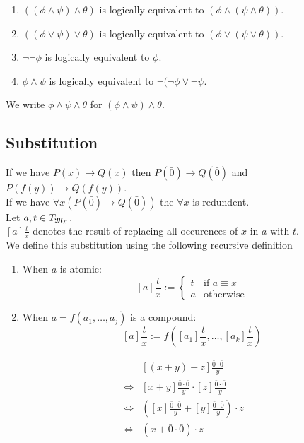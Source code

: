 \documentclass[11pt,a4paper]{article}
\begin{document}
\begin{enumerate}
	\item $((\phi\wedge\psi)\wedge\theta)$ is logically equivalent to $(\phi\wedge(\psi\wedge\theta))$.
	\item $((\phi\vee\psi)\vee\theta)$ is logically equivalent to $(\phi\vee(\psi\vee\theta))$.
	\item $\neg\neg\phi$ is logically equivalent to $\phi$.
	\item $\phi\wedge\psi$ is logically equivalent to $\neg(\neg\phi\vee\neg\psi$.
\end{enumerate}
\nb We write $\phi\wedge\psi\wedge\theta$ for $(\phi\wedge\psi)\wedge\theta$.

\subsection{Substitution}

\remark{}
If we have $P(x)\to Q(x)$ then $P(\bar0)\to Q(\bar0)$ and $P(f(y))\to Q(f(y))$.\\
If we have $\forall x(P(\bar0)\to Q(\bar0))$ the $\forall x$ is redundent.\\

Let $a,t\in T_{\mathfrak{M}_{\mathcal{L}}}$.\\
$[a]\frac{t}x$ denotes the result of replacing all occurences of $x$ in $a$ with $t$.\\
We define this substitution using the following recursive definition
\begin{enumerate}
	\item When $a$ is atomic:
	$$[a]\frac{t}x:=\begin{cases}t&\text{if }a\equiv x\\a&\text{otherwise}\end{cases}$$
	\item When $a=f(a_1,\dots,a_j)$ is a compound:
	$$[a]\frac{t}x:=f\left([a_1]\frac{t}x,\dots,[a_k]\frac{t}x\right)$$
\end{enumerate}

\[\begin{array}{rl}
&[(x+y)+z]\frac{\bar0\cdot\bar0}y\\
\Longleftrightarrow&[x+y]\frac{\bar0\cdot\bar0}y\cdot[z]\frac{\bar0\cdot\bar0}y\\
\Longleftrightarrow&\left([x]\frac{\bar0\cdot\bar0}y+[y]\frac{\bar0\cdot\bar0}y\right)\cdot z\\
\Longleftrightarrow&(x+\bar0\cdot\bar0)\cdot z
\end{array}\]
\end{document}
